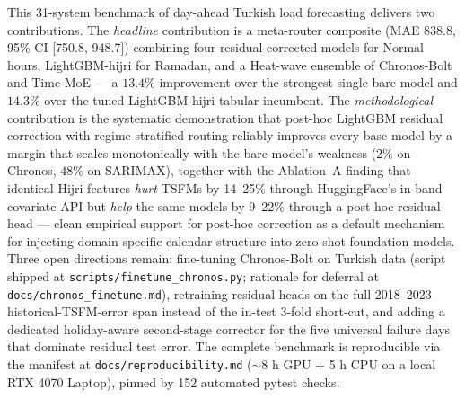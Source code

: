 \documentclass[10pt, a4paper, twocolumn]{article}
\begin{document}
This 31-system benchmark of day-ahead Turkish load forecasting
delivers two contributions. The \emph{headline} contribution is a
meta-router composite (MAE \num{838.8}, 95\% CI [\num{750.8},
\num{948.7}]) combining four residual-corrected models for Normal
hours, LightGBM-hijri for Ramadan, and a Heat-wave ensemble of
Chronos-Bolt and Time-MoE --- a $13.4\%$ improvement over the
strongest single bare model and $14.3\%$ over the tuned
LightGBM-hijri tabular incumbent. The \emph{methodological}
contribution is the systematic demonstration that post-hoc
LightGBM residual correction with regime-stratified routing
reliably improves every base model by a margin that scales
monotonically with the bare model's weakness ($2\%$ on Chronos,
$48\%$ on SARIMAX), together with the Ablation~A finding that
identical Hijri features \emph{hurt} TSFMs by 14--25\% through
HuggingFace's in-band covariate API but \emph{help} the same
models by 9--22\% through a post-hoc residual head --- clean
empirical support for post-hoc correction as a default mechanism
for injecting domain-specific calendar structure into zero-shot
foundation models. Three open directions remain:
fine-tuning Chronos-Bolt on Turkish data (script shipped at
\texttt{scripts/finetune\_chronos.py}; rationale for deferral at
\texttt{docs/chronos\_finetune.md}), retraining residual heads on
the full 2018--2023 historical-TSFM-error span instead of the
in-test 3-fold short-cut, and adding a dedicated holiday-aware
second-stage corrector for the five universal failure days that
dominate residual test error. The complete benchmark is
reproducible via the manifest at
\texttt{docs/reproducibility.md} ($\sim$8 h GPU + 5 h CPU on a
local RTX 4070 Laptop), pinned by 152 automated pytest checks.

\printbibliography[heading=bibintoc, title={References}]

\end{document}
